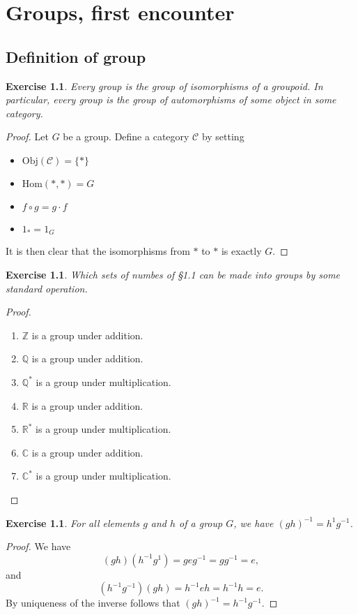 \documentclass[a4paper, 11pt]{book}
\theoremstyle{plain}
\newtheorem{exercise}[theorem]{Exercise}
\theoremstyle{plain}
\begin{document}
\chapter{Groups, first encounter}
\section{Definition of group}
\begin{exercise}
Every group is the group of isomorphisms of a groupoid. In particular, every group is the group of automorphisms of some object in some category.
\end{exercise}
\begin{proof}
Let $G$ be a group. Define a category $\mathcal{C}$ by setting 
\begin{itemize}
    \item $\text{Obj}(\mathcal{C}) = \{*\}$
    \item $\text{Hom}(*,*) = G$
    \item $f\circ g = g\cdot f$
    \item $1_* = 1_G$
\end{itemize}
It is then clear that the isomorphisms from $*$ to $*$ is exactly $G$.
\end{proof}

\begin{exercise}
Which sets of numbes of \S 1.1 can be made into groups by some standard operation.
\end{exercise}
\begin{proof}
\begin{enumerate}
    \item $\mathbb{Z}$ is a group under addition.
    \item $\mathbb{Q}$ is a group under addition.
    \item $\mathbb{Q}^*$ is a group under multiplication.
        \item $\mathbb{R}$ is a group under addition.
    \item $\mathbb{R}^*$ is a group under multiplication.
        \item $\mathbb{C}$ is a group under addition.
    \item $\mathbb{C}^*$ is a group under multiplication.
\end{enumerate}
\end{proof}

\begin{exercise}
For all elements $g$ and $h$ of a group $G$, we have $(gh)^{-1}= h^{1}g^{-1}$.
\end{exercise}
\begin{proof}
We have 
$$(gh)(h^{-1}g^{1}) = geg^{-1} = gg^{-1} = e,$$
and
$$(h^{-1}g^{-1})(gh) = h^{-1}eh = h^{-1}h = e.$$
By uniqueness of the inverse follows that $(gh)^{-1} = h^{-1}g^{-1}$.
\end{proof}
\end{document}
